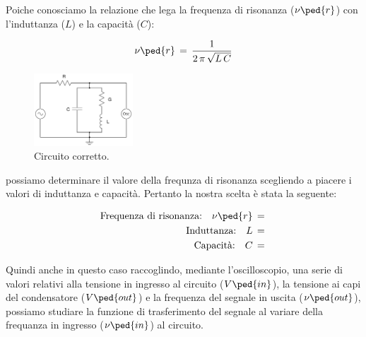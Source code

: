 Poiche conosciamo la relazione che lega la frequenza di risonanza ($\nu\ped{r}$) con l'induttanza ($L$) e la capacità ($C$):

\begin{equation}
	\nu\ped{r} \,=\, \frac{1}{2\,\pi\,\sqrt{L\,C}}
	\label{eq:risonanza banda}
\end{equation}
%
\begin{figure}
  \vspace{-0.5cm}
  \includegraphics[width=0.33\textwidth]{s_corr2.pdf}
  \caption{Circuito corretto.}
  \label{fig:corr2}
  \vspace{-1.5cm}
\end{figure}
%
possiamo determinare il valore della frequnza di risonanza scegliendo a piacere i valori di induttanza e capacità. Pertanto la nostra scelta è stata la seguente:

\begin{align*}
	\text{Frequenza di risonanza:} \quad \nu\ped{r} \,=\, \\
	\text{Induttanza:} \quad L \,=\, \\
	\text{Capacità:} \quad C \,=\, \\
\end{align*}

Quindi anche in questo caso raccoglindo, mediante l'oscilloscopio, una serie di valori relativi alla tensione in ingresso al circuito ($V\ped{in}$), la tensione ai capi del condensatore ($V\ped{out}$) e la frequenza del segnale in uscita ($\nu\ped{out}$), possiamo studiare la funzione di trasferimento del segnale al variare della frequanza in ingresso ($\nu\ped{in}$) al circuito.

